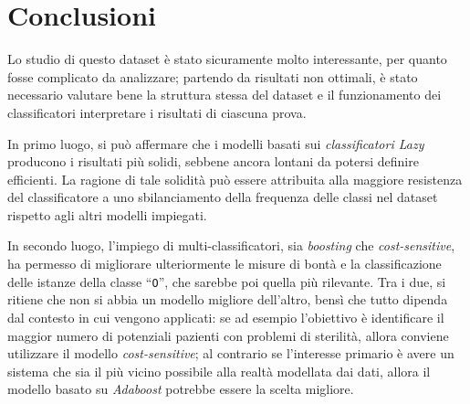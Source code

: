 \newpage

\section{Conclusioni}

Lo studio di questo dataset è stato sicuramente molto interessante, per quanto fosse complicato da analizzare;
partendo da risultati non ottimali, è stato necessario valutare bene la struttura stessa del dataset e il funzionamento dei classificatori
interpretare i risultati di ciascuna prova.

In primo luogo, si può affermare che i modelli basati sui \emph{classificatori Lazy} producono i risultati più solidi, sebbene ancora lontani da potersi definire efficienti.
La ragione di tale solidità può essere attribuita alla maggiore resistenza del classificatore a uno sbilanciamento della frequenza delle classi nel dataset rispetto agli altri modelli impiegati.

In secondo luogo, l'impiego di multi-classificatori, sia \emph{boosting} che \emph{cost-sensitive},
ha permesso di migliorare ulteriormente le misure di bontà e la classificazione delle istanze della classe ``\texttt{O}'', che sarebbe poi quella più rilevante.
Tra i due, si ritiene che non si abbia un modello migliore dell'altro, bensì che tutto dipenda dal contesto in cui vengono applicati:
se ad esempio l'obiettivo è identificare il maggior numero di potenziali pazienti con problemi di sterilità, allora conviene utilizzare il modello \emph{cost-sensitive};
al contrario se l'interesse primario è avere un sistema che sia il più vicino possibile alla realtà modellata dai dati, allora il modello basato su \emph{Adaboost} potrebbe essere la scelta migliore.
